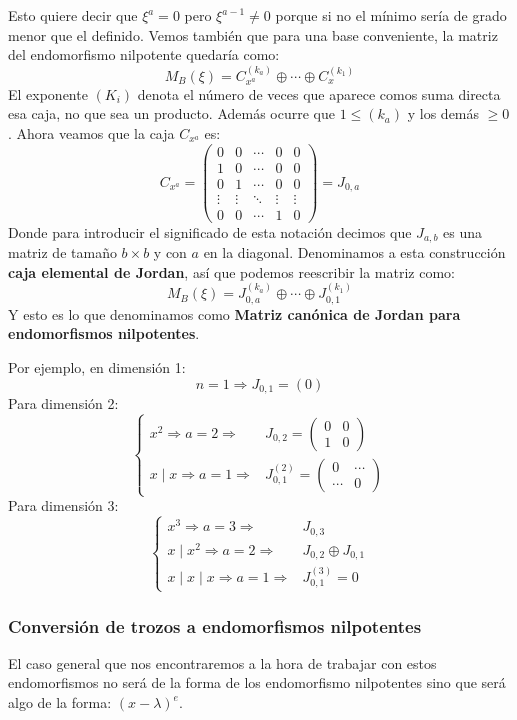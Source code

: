 \documentclass[10pt,a4paper,openright]{book}
\begin{document}
Esto quiere decir que $\xi ^a =0$ pero $\xi ^{a-1}\neq 0$ porque si no el mínimo sería de grado menor que el definido. Vemos también que para una base conveniente, la matriz del endomorfismo nilpotente quedaría como:
$$M_B(\xi) = C_{x^a}^{(k_a)}\oplus \cdots \oplus C_{x}^{(k_1)}$$
El exponente $(K_i)$ denota el número de veces que aparece comos suma directa esa caja, no que sea un producto. Además ocurre que $1\leq (k_a)$ y los demás $\geq 0$. Ahora veamos que la caja $C_{x^a}$ es:
$$C_{x^{a}}=\begin{pmatrix}
0&0&\cdots &0 &0\\
1&0&\cdots &0 &0\\
0&1&\cdots &0 &0\\
\vdots & \vdots& \ddots & \vdots & \vdots \\
0&0&\cdots & 1&0
\end{pmatrix}=J_{0,a}$$
Donde para introducir el significado de esta notación decimos que $J_{a,b}$ es una matriz de tamaño $b\times b$ y con $a$ en la diagonal. Denominamos a esta construcción \textbf{caja elemental de Jordan}, así que podemos reescribir la matriz como:
$$M_B(\xi)=J_{0,a}^{(k_a)}\oplus \cdots \oplus J_{0,1}^{(k_1)}$$
Y esto es lo que denominamos como \textbf{Matriz canónica de Jordan para endomorfismos nilpotentes}.

Por ejemplo, en dimensión 1:
$$n=1\Rightarrow J_{0,1}=(0)$$
Para dimensión 2:
$$\begin{cases}
x^2\Rightarrow a=2\Rightarrow & J_{0,2}=\begin{pmatrix} 0&0 \\ 1&0\end{pmatrix} \\
x\mid x\Rightarrow a=1 \Rightarrow  & J_{0,1}^{(2)} =\begin{pmatrix} 0 & \cdots \\ \cdots & 0\end{pmatrix}\end{cases}$$
Para dimensión 3:
$$\begin{cases}
x^3\Rightarrow a=3\Rightarrow & J_{0,3} \\
x\mid x^2 \Rightarrow a=2\Rightarrow & J_{0,2}\oplus J_{0,1}\\
x\mid x\mid x\Rightarrow a=1\Rightarrow & J_{0,1}^{(3)} = 0
\end{cases}$$

\subsubsection*{Conversión de trozos a endomorfismos nilpotentes}
El caso general que nos encontraremos a la hora de trabajar con estos endomorfismos no será de la forma de los endomorfismo nilpotentes sino que será algo de la forma: $(x-\lambda)^e$.
\end{document}
